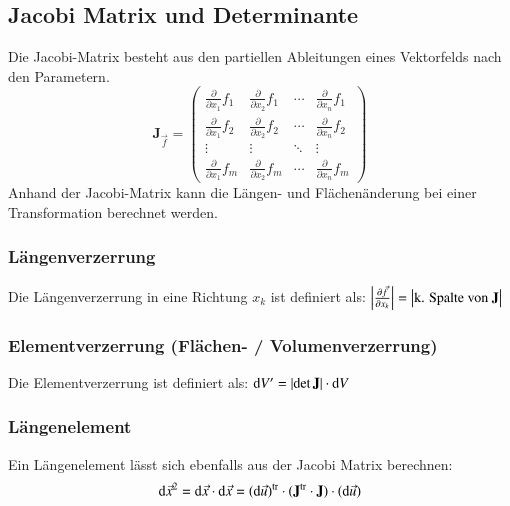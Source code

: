 \subsection{Jacobi Matrix und Determinante}
Die Jacobi-Matrix besteht aus den partiellen Ableitungen eines Vektorfelds nach den Parametern.
\[
    \mathbf{J}_{\vec{f}} = \begin{pmatrix}
        \frac{\partial}{\partial x_1} f_1 & \frac{\partial}{\partial x_2} f_1 & \cdots & \frac{\partial}{\partial x_n} f_1\\
        \frac{\partial}{\partial x_1} f_2 & \frac{\partial}{\partial x_2} f_2 & \cdots & \frac{\partial}{\partial x_n} f_2\\
        \vdots & \vdots & \ddots & \vdots\\
        \frac{\partial}{\partial x_1} f_m & \frac{\partial}{\partial x_2} f_m & \cdots & \frac{\partial}{\partial x_n} f_m
    \end{pmatrix}
\]
Anhand der Jacobi-Matrix kann die Längen- und Flächenänderung bei einer Transformation berechnet werden.

\subsubsection{Längenverzerrung}
Die Längenverzerrung in eine Richtung $x_k$ ist definiert als: $\left|\frac{\partial \vec{f}}{\partial x_k}\right| = \left|\text{k. Spalte von }\mathbf{J}\right|$ 


\subsubsection{Elementverzerrung (Flächen- / Volumenverzerrung)}
Die Elementverzerrung ist definiert als: $\mathop{} \! \mathrm{d} V' = \left|\det \mathbf{J}\right|\cdot\mathop{} \! \mathrm{d} V$ %


\subsubsection{Längenelement}
Ein Längenelement lässt sich ebenfalls aus der Jacobi Matrix berechnen:
\[
    \mathop{} \! \mathrm{d} \vec{x}^2 = \mathop{} \! \mathrm{d}\vec{x}\cdot\mathop{} \! \mathrm{d}\vec{x} = (\mathop{} \! \mathrm{d}\vec{u})^{\operatorname{tr}} \cdot (\mathbf{J}^{\operatorname{tr}} \cdot \mathbf{J}) \cdot (\mathop{} \! \mathrm{d}\vec{u})
\]


